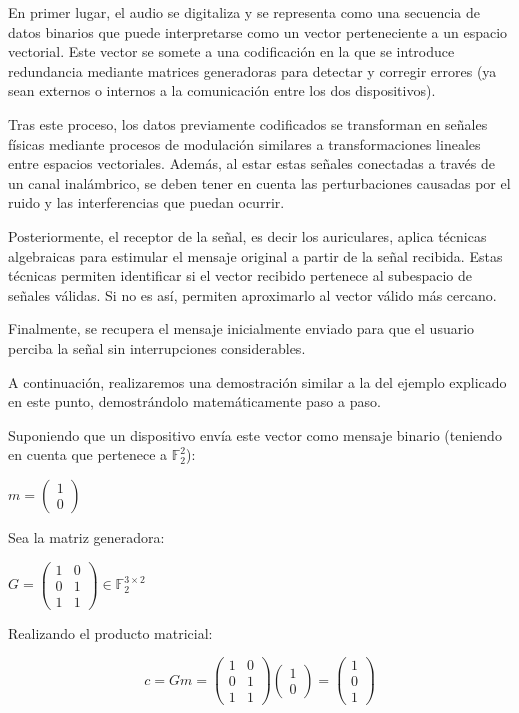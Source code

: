 \documentclass[letterpaper,12pt]{article}
\begin{document}
En primer lugar, el audio se digitaliza y se representa como una secuencia de datos binarios que
puede interpretarse como un vector perteneciente a un espacio vectorial. Este vector se somete a
una codificación en la que se introduce redundancia mediante matrices generadoras para detectar
y corregir errores (ya sean externos o internos a la comunicación entre los dos dispositivos).

Tras este proceso, los datos previamente codificados se transforman en señales físicas mediante
procesos de modulación similares a transformaciones lineales entre espacios vectoriales. Además,
al estar estas señales conectadas a través de un canal inalámbrico, se deben tener en cuenta las
perturbaciones causadas por el ruido y las interferencias que puedan ocurrir.

Posteriormente, el receptor de la señal, es decir los auriculares, aplica técnicas algebraicas para
estimular el mensaje original a partir de la señal recibida. Estas técnicas permiten identificar si el
vector recibido pertenece al subespacio de señales válidas. Si no es así, permiten aproximarlo al
vector válido más cercano.

Finalmente, se recupera el mensaje inicialmente enviado para que el usuario perciba la señal sin
interrupciones considerables.



A continuación, realizaremos una demostración similar a la del ejemplo explicado en este punto,
demostrándolo matemáticamente paso a paso.

\newpage
{}
Suponiendo que un dispositivo envía este vector como mensaje binario (teniendo en cuenta
que pertenece a $\mathbb{F}_2^2$):\\
                                  \centerline{$m = \begin{pmatrix}1 \\ 0\end{pmatrix}$}

Sea la matriz generadora:

\centerline{$G = \begin{pmatrix}1 & 0 \\ 0 & 1 \\ 1 & 1\end{pmatrix}\in\mathbb{F}_2^{3\times 2}$}

Realizando el producto matricial:

\[
c=Gm=\begin{pmatrix}1 & 0 \\ 0 & 1 \\ 1 & 1\end{pmatrix}
\begin{pmatrix}1 \\ 0\end{pmatrix}
=
\begin{pmatrix}1 \\ 0 \\ 1\end{pmatrix}
\]
\end{document}
